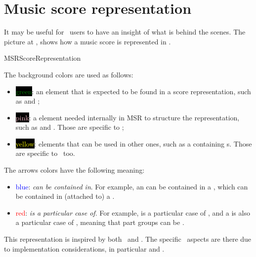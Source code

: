 
\chapter{Music score representation}\label{Music score representation}

It may be useful for \mf\ users to have an insight of what is behind the scenes.
The picture at , shows how a music score is represented in \msrRepr.

{MSRScoreRepresentation}

The background colors are used as follows:
\begin{itemize}
\item \colorbox{black}{\textcolor{green}{green}}: an element that is expected to be found in a score representation, such as  and ;

\item \colorbox{black}{\textcolor{pink}{pink}}: a element needed internally in MSR to structure the representation, such as  and . Those are specific to \mf;

\item \colorbox{black}{\textcolor{yellow}{yellow}}: elements that can be used in other ones, such as a  containing s. Those are specific to \mf\ too.
\end{itemize}

The arrows colors have the following meaning:
\begin{itemize}
\item \textcolor{blue}{blue}: {\it can be contained in}. For example, an  can be contained in a , which can be contained in (attached to) a .

\item \textcolor{red}{red}: {\it is a particular case of}. For example,  is a particular case of , and a  is also a particular case of , meaning that part groups can be .
\end{itemize}

This representation is inspired by both \mxml\ and \lily. The specific \mf\ aspects are there due to implementation considerations, in particular  and .
